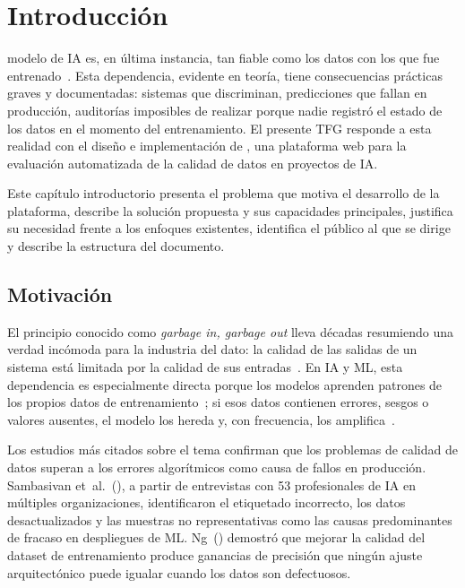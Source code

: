 \chapter{Introducción}
\label{chap:intro}

 modelo de \ac{IA} es, en última instancia, tan fiable como los
datos con los que fue entrenado~\citep{sambasivan2021, ng2021datacentric}.
Esta dependencia, evidente en teoría, tiene
consecuencias prácticas graves y documentadas: sistemas que discriminan,
predicciones que fallan en producción, auditorías imposibles de realizar
porque nadie registró el estado de los datos en el momento del entrenamiento.
El presente \ac{TFG} responde a esta realidad con el diseño e implementación
de \dataqual, una plataforma web para la evaluación automatizada de la calidad
de datos en proyectos de \ac{IA}.

Este capítulo introductorio presenta el problema que motiva el desarrollo de
la plataforma, describe la solución propuesta y sus capacidades principales,
justifica su necesidad frente a los enfoques existentes, identifica el público
al que se dirige y describe la estructura del documento.


\section{Motivación}
\label{sec:motivacion}

El principio conocido como \emph{garbage in, garbage out} lleva décadas
resumiendo una verdad incómoda para la industria del dato: la calidad de las
salidas de un sistema está limitada por la calidad de sus
entradas~\citep{kilkenny2018}.  En
\ac{IA} y \ac{ML}, esta dependencia es especialmente directa porque los
modelos aprenden patrones de los propios datos de entrenamiento~\citep{wang1996}; si esos datos contienen errores, sesgos o valores ausentes, el
modelo los hereda y, con frecuencia, los amplifica~\citep{redman1998}.

Los estudios más citados sobre el tema confirman que los problemas de calidad
de datos superan a los errores algorítmicos como causa de fallos en producción.
Sambasivan et~al.~(\citeyear{sambasivan2021}), a partir de entrevistas con
53 profesionales de \ac{IA} en múltiples organizaciones, identificaron el
etiquetado incorrecto, los datos desactualizados y las muestras no
representativas como las causas predominantes de fracaso en despliegues de
\ac{ML}.  Ng~(\citeyear{ng2021datacentric}) demostró que mejorar la calidad
del dataset de entrenamiento produce ganancias de precisión que ningún ajuste
arquitectónico puede igualar cuando los datos son defectuosos.


